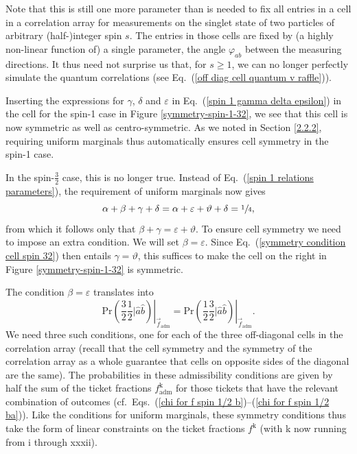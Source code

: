 Note that this is still one more parameter than is needed to fix all entries in a cell in a correlation array for measurements on the singlet state of two particles of arbitrary (half-)integer spin $s$. The entries in those cells are fixed by (a highly non-linear function of) a single parameter, the angle $\varphi_{ab}$ between the measuring directions. It thus need not surprise us that, for $s \ge 1$, we can no longer perfectly simulate the quantum correlations (see Eq.\ (\ref{off diag cell quantum v raffle})).

Inserting the expressions for $\gamma$, $\delta$ and $\varepsilon$ in Eq.\ (\ref{spin 1 gamma delta epsilon}) in the cell for the spin-1 case in Figure \ref{symmetry-spin-1-32}, we see that this cell is now symmetric as well as centro-symmetric. As we noted in Section \ref{2.2.2}, requiring uniform marginals thus automatically ensures cell symmetry in the spin-1 case. 

In the spin-$\frac32$ case, this is no longer true. Instead of Eq.\ (\ref{spin 1 relations parameters}), the requirement of uniform marginals now gives 
\begin{equation}
\alpha + \beta + \gamma + \delta = \alpha + \varepsilon + \vartheta + \delta = \sfrac14,
\label{symmetry condition cell spin 32}
\end{equation}
from which it follows only that $\beta + \gamma = \varepsilon + \vartheta$. To ensure cell symmetry we need to impose an extra condition. We will set $\beta = \varepsilon$. Since Eq.\ (\ref{symmetry condition cell spin 32}) then entails $\gamma = \vartheta$, this suffices to make the cell on the right in Figure \ref{symmetry-spin-1-32} is symmetric. 

The condition $\beta = \varepsilon$ translates into
\begin{equation}
\left. \mathrm{Pr}\left({\textstyle{\frac32}} {\textstyle{\frac12}} \Big| \hat{a}\hat{b}\right)  \right|_{\vec{f}_{\mathrm{adm}}}
= \left. \mathrm{Pr}\left({\textstyle{\frac12}} {\textstyle{\frac32}} \Big| \hat{a}\hat{b}\right)  \right|_{\vec{f}_{\mathrm{adm}}}.
\label{symmetry condition spin 32} 
\end{equation}
We need three such conditions, one for each of the three off-diagonal cells in the correlation array (recall that the cell symmetry and the symmetry of the correlation array as a whole guarantee that cells on opposite sides of the diagonal are the same). The probabilities in these admissibility conditions are given by half the sum of the ticket fractions $f^{\mathrm{k}}_{\mathrm{adm}}$ for those tickets that have the relevant combination of outcomes (cf.\ Eqs.\ (\ref{chi for f spin 1/2 b})--(\ref{chi for f spin 1/2 ba})). Like the conditions for uniform marginals, these symmetry conditions thus take the form of linear constraints on the ticket fractions $f^\mathrm{k}$ (with k now running from i through xxxii). 

